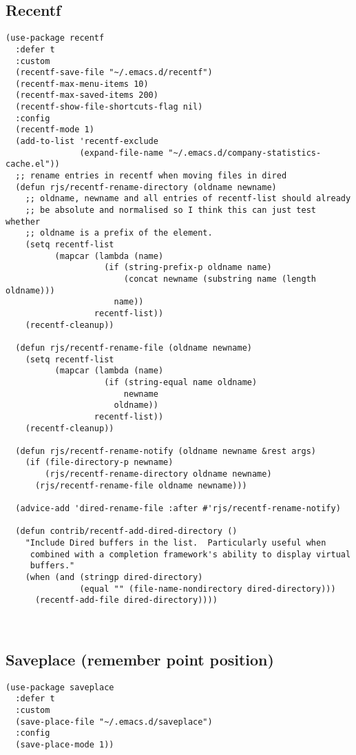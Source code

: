\documentclass[12pt]{article}
\begin{document}
\subsection{Recentf}
\label{sec:orgb428532}
\begin{verbatim}
(use-package recentf
  :defer t
  :custom
  (recentf-save-file "~/.emacs.d/recentf")
  (recentf-max-menu-items 10)
  (recentf-max-saved-items 200)
  (recentf-show-file-shortcuts-flag nil)
  :config
  (recentf-mode 1)
  (add-to-list 'recentf-exclude
               (expand-file-name "~/.emacs.d/company-statistics-cache.el"))
  ;; rename entries in recentf when moving files in dired
  (defun rjs/recentf-rename-directory (oldname newname)
    ;; oldname, newname and all entries of recentf-list should already
    ;; be absolute and normalised so I think this can just test whether
    ;; oldname is a prefix of the element.
    (setq recentf-list
          (mapcar (lambda (name)
                    (if (string-prefix-p oldname name)
                        (concat newname (substring name (length oldname)))
                      name))
                  recentf-list))
    (recentf-cleanup))

  (defun rjs/recentf-rename-file (oldname newname)
    (setq recentf-list
          (mapcar (lambda (name)
                    (if (string-equal name oldname)
                        newname
                      oldname))
                  recentf-list))
    (recentf-cleanup))

  (defun rjs/recentf-rename-notify (oldname newname &rest args)
    (if (file-directory-p newname)
        (rjs/recentf-rename-directory oldname newname)
      (rjs/recentf-rename-file oldname newname)))

  (advice-add 'dired-rename-file :after #'rjs/recentf-rename-notify)

  (defun contrib/recentf-add-dired-directory ()
    "Include Dired buffers in the list.  Particularly useful when
     combined with a completion framework's ability to display virtual
     buffers."
    (when (and (stringp dired-directory)
               (equal "" (file-name-nondirectory dired-directory)))
      (recentf-add-file dired-directory))))



\end{verbatim}

\subsection{Saveplace (remember point position)}
\label{sec:org04e63c3}
\begin{verbatim}
(use-package saveplace
  :defer t
  :custom
  (save-place-file "~/.emacs.d/saveplace")
  :config
  (save-place-mode 1))
\end{verbatim}
\end{document}

